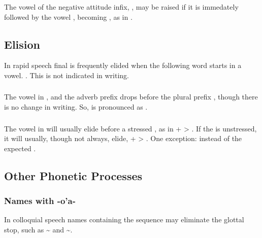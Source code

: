 \subsubsection{} The vowel of the negative attitude infix,
, may be raised if it is immedately followed by the vowel
, becoming , as in .\label{l-and-s:eng}

\subsection{Elision} In rapid speech final  is frequently elided
when the following word starts in a vowel.  .  This is not indicated in writing.

\subsubsection{} The vowel  in ,  and the adverb
prefix  drops before the plural prefix , though there is
no change in writing.  So,   is pronounced as
. \label{l-and-s:elision-i}

\subsubsection{} The vowel in  will usually elide before a
stressed , as in  +  > . If the 
is unstressed, it will usually, though not always, elide,  +
 > . One exception:  instead of the
expected .

\subsection{Other Phonetic Processes}

\subsubsection{Names with -o'a-} In colloquial speech names containing
the sequence  may eliminate the glottal stop, such
as  \textasciitilde{} 
and  \textasciitilde {}.


